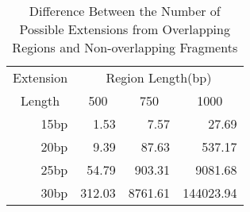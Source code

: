 \begin{table}[bth]
\caption{Difference Between the Number of Possible Extensions from Overlapping
Regions and Non-overlapping Fragments}
\label{'table4'}
\begin{center}
\begin{tabular}{||r|rrr||}  \hline
\multicolumn{1}{||c|}{Extension} & \multicolumn{3}{c||}{Region Length(bp)} \\ 
\multicolumn{1}{||c|}{Length}
& \multicolumn{1}{c}{500} & \multicolumn{1}{c}{750}
& \multicolumn{1}{c||}{1000} \\ \hline
15bp &   1.53 &    7.57 &     27.69 \\
20bp &   9.39 &   87.63 &    537.17 \\
25bp &  54.79 &  903.31 &   9081.68 \\
30bp & 312.03 & 8761.61 & 144023.94 \\ \hline
\end{tabular}
\end{center}
\end{table}
